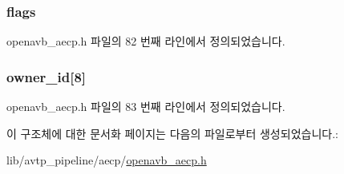 \subsubsection[{\texorpdfstring{flags}{flags}}]{ flags}\hypertarget{structopenavb__aecp__command__data__acquire__entity__t_a66936d9b1b8185ff2dd6aaee07c22a2b}{}\label{structopenavb__aecp__command__data__acquire__entity__t_a66936d9b1b8185ff2dd6aaee07c22a2b}


openavb\+\_\+aecp.\+h 파일의 82 번째 라인에서 정의되었습니다.

\subsubsection[{\texorpdfstring{owner\+\_\+id}{owner_id}}]{ owner\+\_\+id\mbox{[}8\mbox{]}}\hypertarget{structopenavb__aecp__command__data__acquire__entity__t_ad571ead988eae05d924b81ef361c6047}{}\label{structopenavb__aecp__command__data__acquire__entity__t_ad571ead988eae05d924b81ef361c6047}


openavb\+\_\+aecp.\+h 파일의 83 번째 라인에서 정의되었습니다.



이 구조체에 대한 문서화 페이지는 다음의 파일로부터 생성되었습니다.\+:\begin{DoxyCompactItemize}
\item 
lib/avtp\+\_\+pipeline/aecp/\hyperlink{openavb__aecp_8h}{openavb\+\_\+aecp.\+h}\end{DoxyCompactItemize}
